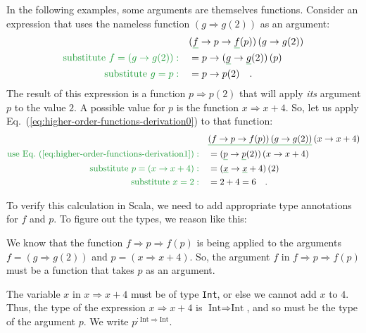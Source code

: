 In the following examples, some arguments are themselves functions.
Consider an expression that uses the nameless function $\left(g\Rightarrow g(2)\right)$
as an argument:
\begin{align}
 & (\gunderline f\Rightarrow p\Rightarrow\gunderline f(p))\left(g\Rightarrow g(2)\right)\label{eq:higher-order-functions-derivation0}\\
{\color{greenunder}\text{substitute }f=\left(g\Rightarrow g(2)\right):}\quad & =p\Rightarrow(\gunderline g\Rightarrow\gunderline g(2))\,(p)\nonumber \\
{\color{greenunder}\text{substitute }g=p:}\quad & =p\Rightarrow p(2)\quad.\label{eq:higher-order-functions-derivation1}
\end{align}
The result of this expression is a function $p\Rightarrow p(2)$ that
will apply \emph{its} argument $p$ to the value $2$. A possible
value for $p$ is the function $x\Rightarrow x+4$. So, let us apply
Eq.~(\ref{eq:higher-order-functions-derivation0}) to that function:
\begin{align*}
 & \gunderline{\left(f\Rightarrow p\Rightarrow f(p)\right)\left(g\Rightarrow g(2)\right)}\left(x\Rightarrow x+4\right)\\
{\color{greenunder}\text{use Eq.~(\ref{eq:higher-order-functions-derivation1})}:}\quad & =(\gunderline p\Rightarrow\gunderline p(2))\left(x\Rightarrow x+4\right)\\
{\color{greenunder}\text{substitute }p=\left(x\Rightarrow x+4\right):}\quad & =(\gunderline x\Rightarrow\gunderline x+4)\left(2\right)\\
{\color{greenunder}\text{substitute }x=2:}\quad & =2+4=6\quad.
\end{align*}

To verify this calculation in Scala, we need to add appropriate type
annotations for $f$ and $p$. To figure out the types, we reason
like this:

We know that the function $f\Rightarrow p\Rightarrow f(p)$ is being
applied to the arguments $f=\left(g\Rightarrow g(2)\right)$ and $p=\left(x\Rightarrow x+4\right)$.
So, the argument $f$ in $f\Rightarrow p\Rightarrow f(p)$ must be
a function that takes $p$ as an argument.

The variable $x$ in $x\Rightarrow x+4$ must be of type \lstinline!Int!,
or else we cannot add $x$ to $4$. Thus, the type of the expression
$x\Rightarrow x+4$ is $\text{Int}\Rightarrow\text{Int}$, and so
must be the type of the argument $p$. We write $p^{:\text{Int}\Rightarrow\text{Int}}$.

